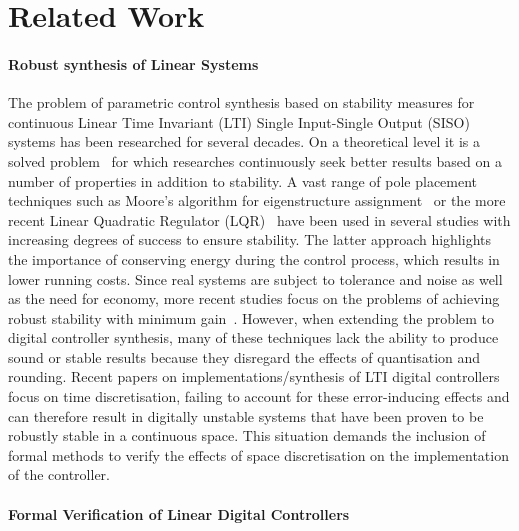 \documentclass{sig-alternate-05-2015}
\begin{document}
\section{Related Work}\label{sec:related}

\paragraph{Robust synthesis of Linear Systems} 

The problem of parametric control synthesis based on stability measures for
continuous Linear Time Invariant (LTI) Single Input-Single Output (SISO)
systems has been researched for several decades.  On a theoretical level it
is a solved problem~\cite{wonham1967pole} for which researches continuously
seek better results based on a number of properties in addition to
stability.  A vast range of pole placement techniques such as Moore's
algorithm for eigenstructure assignment~\cite{klein1977eigenvalue} or the
more recent Linear Quadratic Regulator (LQR)~\cite{bemporad2002explicit}
have been used in several studies with increasing degrees of success to
ensure stability.  The latter approach highlights the importance of
conserving energy during the control process, which results in lower running
costs.  Since real systems are subject to tolerance and noise as well as the
need for economy, more recent studies focus on the problems of achieving
robust stability with minimum gain~\cite{schmid2014unified,
konigorski2012pole}.  However, when extending the problem to digital
controller synthesis, many of these techniques lack the ability to produce
sound or stable results because they disregard the effects of quantisation
and rounding.  Recent papers on implementations/synthesis of LTI digital
controllers~\cite{das2013lqr,ghosh2013fpga} focus on time discretisation,
failing to account for these error-inducing effects and can therefore result
in digitally unstable systems that have been proven to be robustly stable in
a continuous space.  This situation demands the inclusion of formal methods
to verify the effects of space discretisation on the implementation of the
controller.

\paragraph{Formal Verification of Linear Digital Controllers} 
\end{document}
